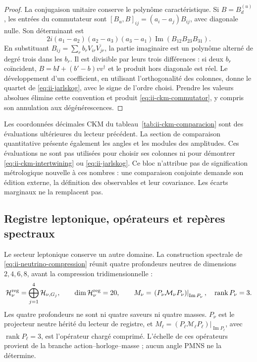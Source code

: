 \begin{proof}
La conjugaison unitaire conserve le polynôme caractéristique. Si
\(B=B_d^{(u)}\), les entrées du commutateur sont
\([B_u,B]_{ij}=(a_i-a_j)B_{ij}\), avec diagonale nulle. Son déterminant est
\[
 2i(a_1-a_2)(a_2-a_3)(a_3-a_1)
     \operatorname{Im}(B_{12}B_{23}B_{31}).
\]
En substituant \(B_{ij}=\sum_r b_rV_{ir}\overline{V_{jr}}\), la partie
imaginaire est un polynôme alterné de degré trois dans les \(b_r\).
Il est divisible par leurs trois différences : si deux \(b_r\) coïncident,
\(B=bI+(b'-b)vv^\dagger\) et le produit hors diagonale est réel.
Le développement d'un coefficient, en utilisant l'orthogonalité des colonnes,
donne le quartet de \eqref{eq:ii-jarlskog}, avec le signe de l'ordre choisi.
Prendre les valeurs absolues élimine cette convention et produit
\eqref{eq:ii-ckm-commutator}, y compris son annulation aux dégénérescences.
\end{proof}

\begin{remark}
Les coordonnées décimales CKM du
tableau~\ref{tab:ii-ckm-comparacion} sont des évaluations ultérieures du
lecteur précédent. La section de comparaison quantitative présente également
les angles et les modules des amplitudes. Ces évaluations ne sont pas
utilisées pour choisir ses colonnes ni pour démontrer
\eqref{eq:ii-ckm-intertwining} ou \eqref{eq:ii-jarlskog}.
Ce bloc n'attribue pas de signification métrologique nouvelle à ces nombres :
une comparaison conjointe demande son édition externe, la définition des
observables et leur covariance. Les écarts marginaux ne la remplacent pas.
\end{remark}

\subsection{Registre leptonique, opérateurs et repères spectraux}

Le secteur leptonique conserve un autre domaine. La construction spectrale de
\eqref{eq:ii-neutrino-compression} réunit quatre profondeurs neutres de dimensions
\(2,4,6,8\), avant la compression tridimensionnelle :
\begin{equation}
 \mathcal H_\nu^{\rm reg}
 =\bigoplus_{j=1}^{4}\mathcal H_{\nu,G_j},\qquad
 \dim\mathcal H_\nu^{\rm reg}=20,\qquad
 M_\nu=\left.(P_\nu\mathcal M_\nu P_\nu)\right|_{\operatorname{Im}P_\nu},
 \quad\operatorname{rank}P_\nu=3.
 \label{eq:ii-neutrino-compression}
\end{equation}
Les quatre profondeurs ne sont ni quatre saveurs ni quatre masses.
\(P_\nu\) est le projecteur neutre hérité du lecteur de registre, et
\(M_\ell=\left.(P_\ell\mathcal M_\ell P_\ell)\right|_{\operatorname{Im}P_\ell}\),
avec \(\operatorname{rank}P_\ell=3\), est l'opérateur chargé comprimé.
L'échelle de ces opérateurs provient de la branche action--horloge--masse ;
aucun angle PMNS ne la détermine.

